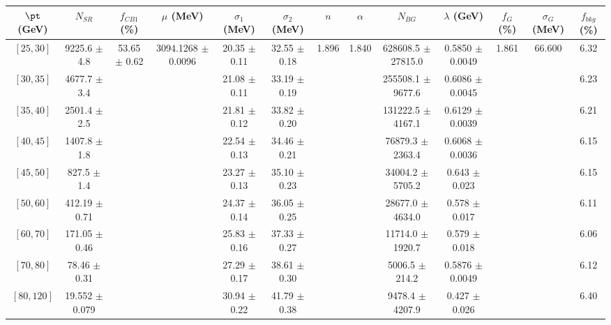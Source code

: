\begin{tabular}{c||c|c|c|c|c|c|c|c|c|c|c||c}
$\pt$ (GeV) & $N_{SR}$ & $f_{CB1}$ (\%) & $\mu$ (MeV) & $\sigma_1$ (MeV) & $\sigma_2$ (MeV) & $n$ & $\alpha$ & $N_{BG}$ & $\lambda$ (GeV) & $f_G$ (\%) & $\sigma_G$ (MeV) & $f_{bkg}$ (\%) \\
\hline
$[25, 30]$ & 9225.6 $\pm$ 4.8 & \multirow{9}{*}{53.65 $\pm$ 0.62} & \multirow{9}{*}{3094.1268 $\pm$ 0.0096} & 20.35 $\pm$ 0.11 & 32.55 $\pm$ 0.18 & \multirow{9}{*}{1.896} & \multirow{9}{*}{1.840} & 628608.5 $\pm$ 27815.0 & 0.5850 $\pm$ 0.0049 & \multirow{9}{*}{1.861} & \multirow{9}{*}{66.600} & 6.32\\
$[30, 35]$ & 4677.7 $\pm$ 3.4 &  &  & 21.08 $\pm$ 0.11 & 33.19 $\pm$ 0.19 &  &  & 255508.1 $\pm$ 9677.6 & 0.6086 $\pm$ 0.0045 &  &  & 6.23\\
$[35, 40]$ & 2501.4 $\pm$ 2.5 &  &  & 21.81 $\pm$ 0.12 & 33.82 $\pm$ 0.20 &  &  & 131222.5 $\pm$ 4167.1 & 0.6129 $\pm$ 0.0039 &  &  & 6.21\\
$[40, 45]$ & 1407.8 $\pm$ 1.8 &  &  & 22.54 $\pm$ 0.13 & 34.46 $\pm$ 0.21 &  &  & 76879.3 $\pm$ 2363.4 & 0.6068 $\pm$ 0.0036 &  &  & 6.15\\
$[45, 50]$ & 827.5 $\pm$ 1.4 &  &  & 23.27 $\pm$ 0.13 & 35.10 $\pm$ 0.23 &  &  & 34004.2 $\pm$ 5705.2 & 0.643 $\pm$ 0.023 &  &  & 6.15\\
$[50, 60]$ & 412.19 $\pm$ 0.71 &  &  & 24.37 $\pm$ 0.14 & 36.05 $\pm$ 0.25 &  &  & 28677.0 $\pm$ 4634.0 & 0.578 $\pm$ 0.017 &  &  & 6.11\\
$[60, 70]$ & 171.05 $\pm$ 0.46 &  &  & 25.83 $\pm$ 0.16 & 37.33 $\pm$ 0.27 &  &  & 11714.0 $\pm$ 1920.7 & 0.579 $\pm$ 0.018 &  &  & 6.06\\
$[70, 80]$ & 78.46 $\pm$ 0.31 &  &  & 27.29 $\pm$ 0.17 & 38.61 $\pm$ 0.30 &  &  & 5006.5 $\pm$ 214.2 & 0.5876 $\pm$ 0.0049 &  &  & 6.12\\
$[80, 120]$ & 19.552 $\pm$ 0.079 &  &  & 30.94 $\pm$ 0.22 & 41.79 $\pm$ 0.38 &  &  & 9478.4 $\pm$ 4207.9 & 0.427 $\pm$ 0.026 &  &  & 6.40\\
\end{tabular}
